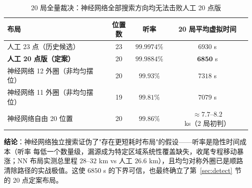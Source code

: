 \begin{table}[H]
  \centering
  \caption{20 局全量裁决：神经网络全部搜索方向均无法击败人工 20 点版}
  \label{tab:nn_verdict}
  \begin{tabular}{lccc}
    \toprule
    \textbf{布局} & \textbf{位置数} & \textbf{听率} & \textbf{20 局平均虚拟时间} \\
    \midrule
    人工 23 点（历史候选）          & 23 & $99.9974\%$ & $6930$ s \\
    \textbf{人工 20 点版（定案）}   & 20 & $99.9884\%$ & $\mathbf{6850}$ s \\
    神经网络 12 外圈（非均匀摆位）  & 20 & $99.93\%$   & $7318$ s \\
    神经网络 11 外圈（非均匀摆位）  & 19 & $99.81\%$   & $7079$ s \\
    神经网络自由 20 位置            & 20 & $99.86\%$   & $\approx 7.7$--$8.2$ ks（2 局初判） \\
    \bottomrule
  \end{tabular}
\end{table}

\textbf{结论}：神经网络独立搜索证伪了"存在更短耗时布局"的假设——听率是隐性时间成本（听率
每低一个数量级，漏源成为特定区域系统性覆盖缺失，收尾专程移动暴涨；NN 布局实测总里程
$28$--$32$ km vs 人工 $26.6$ km），且均匀对称外圈已是顺路清除路径的实战极值。这使
$6850$ s 的下界可信，也最终确立了第~\ref{sec:detect} 节的 20 点定案布局。